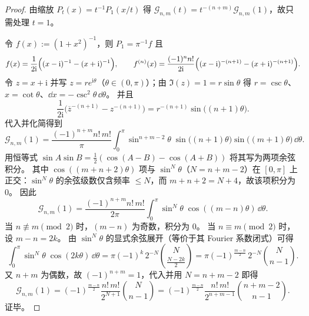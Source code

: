 \begin{proof}
由缩放 \(P_t(x)=t^{-1}P_1(x/t)\) 得
\(
\mathcal G_{n,m}(t)=t^{-(n+m)}\mathcal G_{n,m}(1)
\)，故只需处理 \(t=1\)。
\par
令 \(f(x):=(1+x^2)^{-1}\)，则 \(P_1=\pi^{-1}f\) 且
\[
f(x)=\frac{1}{2\mathrm{i}}\Bigl((x-\mathrm{i})^{-1}-(x+\mathrm{i})^{-1}\Bigr),
\qquad
f^{(n)}(x)=\frac{(-1)^n n!}{2\mathrm{i}}\Bigl((x-\mathrm{i})^{-(n+1)}-(x+\mathrm{i})^{-(n+1)}\Bigr).
\]
令 \(z=x+\mathrm{i}\) 并写 \(z=re^{\mathrm{i}\theta}\)（\(\theta\in(0,\pi)\)）；由 \(\Im(z)=1=r\sin\theta\) 得 \(r=\csc\theta\)、\(x=\cot\theta\)、\(\dd x=-\csc^2\theta\,\dd\theta\)。
并且
\[
\frac{1}{2\mathrm{i}}\bigl(\overline z^{-(n+1)}-z^{-(n+1)}\bigr)
=r^{-(n+1)}\sin\bigl((n+1)\theta\bigr).
\]
代入并化简得到
\[
\mathcal G_{n,m}(1)
=\frac{(-1)^{n+m}n!\,m!}{\pi}
\int_{0}^{\pi}\sin^{n+m-2}\theta\;
\sin\bigl((n+1)\theta\bigr)\sin\bigl((m+1)\theta\bigr)\,\dd\theta.
\]
用恒等式 \(\sin A\sin B=\tfrac12(\cos(A-B)-\cos(A+B))\) 将其写为两项余弦积分。
其中 \(\cos((m+n+2)\theta)\) 项与 \(\sin^{N}\theta\)（\(N=n+m-2\)）在 \([0,\pi]\) 上正交：\(\sin^{N}\theta\) 的余弦级数仅含频率 \(\le N\)，而 \(m+n+2=N+4\)，故该项积分为 \(0\)。
因此
\[
\mathcal G_{n,m}(1)
=\frac{(-1)^{n+m}n!\,m!}{2\pi}\int_{0}^{\pi}\sin^{N}\theta\;\cos((m-n)\theta)\,\dd\theta.
\]
当 \(n\not\equiv m\pmod 2\) 时，\((m-n)\) 为奇数，积分为 \(0\)。
当 \(n\equiv m\pmod 2\) 时，设 \(m-n=2k\)。
由 \(\sin^{N}\theta\) 的显式余弦展开（等价于其 Fourier 系数闭式）可得
\[
\int_{0}^{\pi}\sin^{N}\theta\;\cos(2k\theta)\,\dd\theta
=\pi(-1)^k\,2^{-N}\binom{N}{\frac{N-2k}{2}}
=\pi(-1)^{\frac{m-n}{2}}\,2^{-N}\binom{N}{n-1}.
\]
又 \(n+m\) 为偶数，故 \((-1)^{n+m}=1\)，代入并用 \(N=n+m-2\) 即得
\[
\mathcal G_{n,m}(1)=(-1)^{\frac{m-n}{2}}\frac{n!\,m!}{2^{N+1}}\binom{N}{n-1}
=(-1)^{\frac{m-n}{2}}\frac{n!\,m!}{2^{n+m-1}}\binom{n+m-2}{n-1}.
\]
证毕。
\end{proof}

